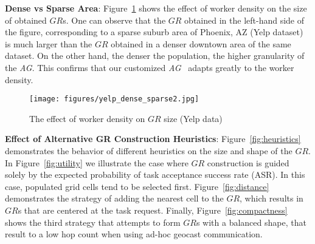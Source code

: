 \documentclass{USC-Thesis}
\newcommand{\PGC}{{PrivGeoCrowd}}
\numberwithin{equation}{chapter}
\begin{document}
   
   
%   
   
   
   
\textbf{Dense vs Sparse Area}: Figure~\ref{fig:dense_sparse} shows the effect of worker density on the size of obtained $\mathit{GR}$s. One can observe that the $\mathit{GR}$ obtained in the left-hand side of the figure, corresponding to a sparse suburb area of Phoenix, AZ (Yelp dataset) is much larger than the $\mathit{GR}$ obtained in a denser downtown area of the same dataset. On the other hand, the denser the population, the higher granularity of the {\em AG}. This confirms that our customized {\em AG}~\cite{to2014framework} adapts greatly to the worker density.


\begin{figure}[!htb]
\centering
  \texttt{[image: figures/yelp\_dense\_sparse2.jpg]}
  \caption{The effect of worker density on $\mathit{GR}$ size (Yelp data)}
  \label{fig:dense_sparse}
\end{figure}

\textbf{Effect of Alternative GR Construction Heuristics}: Figure~\ref{fig:heuristics} demonstrates the behavior of different heuristics on the size and shape of the $\mathit{GR}$. In Figure~\ref{fig:utility} we illustrate the case where $GR$ construction is guided solely by the expected probability of task acceptance success rate (ASR). In this case, populated grid cells tend to be selected first. Figure~\ref{fig:distance} demonstrates the strategy of adding the nearest cell to the $GR$, which results in $\mathit{GR}$s that are centered at the task request. Finally, Figure~\ref{fig:compactness} shows the third strategy that attempts to form $GR$s with a balanced shape, that result to a low hop count when using ad-hoc geocast communication.
\end{document}
